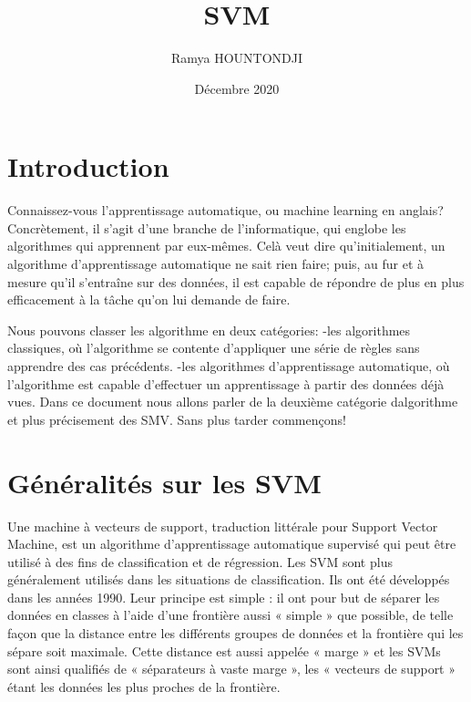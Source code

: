 \documentclass{article}
\title{SVM}
\author{Ramya HOUNTONDJI}
\date{Décembre 2020}
\begin{document}
\maketitle

\section{Introduction}

Connaissez-vous l’apprentissage automatique, ou machine learning en anglais? Concrètement, il s’agit d’une branche de l’informatique, qui englobe les algorithmes qui apprennent par eux-mêmes. Celà veut dire qu'initialement, un algorithme d’apprentissage automatique ne sait rien faire; puis, au fur et à mesure qu’il s’entraîne sur des données, il est capable de répondre de plus en plus efficacement à la tâche qu’on lui demande de faire. 

\vspace{5mm} %
Nous pouvons classer les algorithme en deux catégories:
\vspace{5mm} %
  -les algorithmes classiques, où l’algorithme se contente d’appliquer une série de règles sans apprendre des cas précédents.
  -les algorithmes d’apprentissage automatique, où l’algorithme est capable d’effectuer un apprentissage à partir des données déjà vues.
\vspace{5mm} %
Dans ce document nous allons parler de la deuxième catégorie dalgorithme et plus précisement des SMV.
Sans plus tarder commençons!
\vspace{5mm} %
\section{Généralités sur les SVM}
\vspace{5mm} %

Une machine à vecteurs de support, traduction littérale pour Support Vector Machine, est un algorithme d’apprentissage automatique supervisé qui peut être utilisé à des fins de classification et de régression. Les SVM sont plus généralement utilisés dans les situations de classification.
Ils ont été développés dans les années 1990.  
Leur principe est simple : il ont pour but de séparer les données en classes à l’aide d’une frontière aussi « simple » que possible, de telle façon que la distance entre les différents groupes de données et la frontière qui les sépare soit maximale.
Cette distance est aussi appelée « marge » et les SVMs sont ainsi qualifiés de « séparateurs à vaste marge », les « vecteurs de support » étant les données les plus proches de la frontière.
\end{document}
